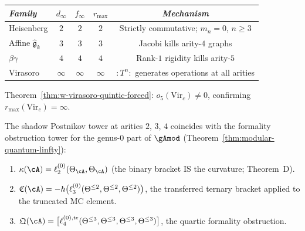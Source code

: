 \begin{example}
\label{ex:operadic-complexity-verification}
\begin{center}
\small
\renewcommand{\arraystretch}{1.15}
\begin{tabular}{lcccc}
\toprule
\emph{Family} &
$d_\infty$ &
$f_\infty$ &
$r_{\max}$ &
\emph{Mechanism} \\
\midrule
Heisenberg &
  $2$ & $2$ & $2$ &
  Strictly commutative; $m_n = 0$, $n \geq 3$ \\
Affine $\hat{\mathfrak{g}}_k$ &
  $3$ & $3$ & $3$ &
  Jacobi kills arity-$4$ graphs \\
$\beta\gamma$ &
  $4$ & $4$ & $4$ &
  Rank-$1$ rigidity kills arity-$5$ \\
Virasoro &
  $\infty$ & $\infty$ & $\infty$ &
  $:T^n:$ generates operations at all arities \\
\bottomrule
\end{tabular}
\end{center}
Theorem~\textup{\ref{thm:w-virasoro-quintic-forced}}:
$o_5(\mathrm{Vir}_c) \neq 0$, confirming
$r_{\max}(\mathrm{Vir}_c) = \infty$.
\end{example}

\begin{proposition}
\label{prop:shadow-formality-low-arity}
\ClaimStatusProvedHere
{}
The shadow Postnikov tower at arities $2$, $3$, $4$
coincides with the formality obstruction tower for the
genus-$0$ part of $\gAmod$
\textup{(}Theorem~\textup{\ref{thm:modular-quantum-linfty})}:
\begin{enumerate}[label=\textup{(\roman*)}]
\item $\kappa(\cA) = \ell_2^{(0)}(\Theta_\cA, \Theta_\cA)$
  \textup{(}the binary bracket IS the curvature;
  Theorem~D\textup{)}.
\item $\mathfrak{C}(\cA)
  = -h\bigl(\ell_3^{(0)}(\Theta^{\leq 2},
  \Theta^{\leq 2}, \Theta^{\leq 2})\bigr)$,
  the transferred ternary bracket applied to
  the truncated MC element.
\item $\mathfrak{Q}(\cA)
  = \bigl[\ell_4^{(0),\mathrm{tr}}(\Theta^{\leq 3},
  \Theta^{\leq 3}, \Theta^{\leq 3}, \Theta^{\leq 3})
  \bigr]$,
  the quartic formality obstruction.
\end{enumerate}
\end{proposition}

